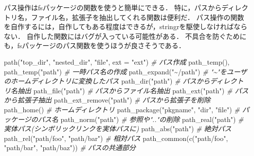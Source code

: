 \documentclass[
]{article}
\newenvironment{Shaded}{\begin{snugshade}}{\end{snugshade}}
\newcommand{\AttributeTok}[1]{\textcolor[rgb]{0.77,0.63,0.00}{#1}}
\newcommand{\CommentTok}[1]{\textcolor[rgb]{0.56,0.35,0.01}{\textit{#1}}}
\newcommand{\FunctionTok}[1]{\textcolor[rgb]{0.00,0.00,0.00}{#1}}
\newcommand{\NormalTok}[1]{#1}
\newcommand{\StringTok}[1]{\textcolor[rgb]{0.31,0.60,0.02}{#1}}
\begin{document}
パス操作はfsパッケージの関数を使うと簡単にできる．
特に，パスからディレクトリ名，ファイル名，拡張子を抽出してくれる関数は便利だ．
パス操作の関数を自作するには，自作してもある程度はできるが，stringrを駆使しなければならない．
自作した関数にはバグが入っている可能性がある．
不具合を防ぐためにも，fsパッケージのパス関数を使うほうが良さそうである．

\begin{Shaded}
\begin{Highlighting}[]
\FunctionTok{path}\NormalTok{(}\StringTok{"top\_dir"}\NormalTok{, }\StringTok{"nested\_dir"}\NormalTok{, }\StringTok{"file"}\NormalTok{, }\AttributeTok{ext =} \StringTok{"ext"}\NormalTok{)  }\CommentTok{\# パス作成   }
\FunctionTok{path\_temp}\NormalTok{(), }\FunctionTok{path\_temp}\NormalTok{(}\StringTok{"path"}\NormalTok{)                      }\CommentTok{\# 一時パス名の作成   }
\FunctionTok{path\_expand}\NormalTok{(}\StringTok{"\textasciitilde{}/path"}\NormalTok{)                               }\CommentTok{\# "\textasciitilde{}"をユーザのホームディレクトリに変換したパス   }
\FunctionTok{path\_dir}\NormalTok{(}\StringTok{"path"}\NormalTok{)                                    }\CommentTok{\# パスからディレクトリ名抽出   }
\FunctionTok{path\_file}\NormalTok{(}\StringTok{"path"}\NormalTok{)                                   }\CommentTok{\# パスからファイル名抽出   }
\FunctionTok{path\_ext}\NormalTok{(}\StringTok{"path"}\NormalTok{)                                    }\CommentTok{\# パスから拡張子抽出   }
\FunctionTok{path\_ext\_remove}\NormalTok{(}\StringTok{"path"}\NormalTok{)                             }\CommentTok{\# パスから拡張子を削除   }
\FunctionTok{path\_home}\NormalTok{()                                         }\CommentTok{\# ホームディレクトリ   }
\FunctionTok{path\_package}\NormalTok{(}\StringTok{"pkgname"}\NormalTok{, }\StringTok{"dir"}\NormalTok{, }\StringTok{"file"}\NormalTok{)              }\CommentTok{\# パッケージのパス名   }
\FunctionTok{path\_norm}\NormalTok{(}\StringTok{"path"}\NormalTok{)                                   }\CommentTok{\# 参照や".."の削除   }
\FunctionTok{path\_real}\NormalTok{(}\StringTok{"path"}\NormalTok{)                                   }\CommentTok{\# 実体パス(シンボリックリンクを実体パスに)   }
\FunctionTok{path\_abs}\NormalTok{(}\StringTok{"path"}\NormalTok{)                                    }\CommentTok{\# 絶対パス}
\FunctionTok{path\_rel}\NormalTok{(}\StringTok{"path/foo"}\NormalTok{, }\StringTok{"path/bar"}\NormalTok{)                    }\CommentTok{\# 相対パス}
\FunctionTok{path\_common}\NormalTok{(}\FunctionTok{c}\NormalTok{(}\StringTok{"path/foo"}\NormalTok{, }\StringTok{"path/bar"}\NormalTok{, }\StringTok{"path/baz"}\NormalTok{))  }\CommentTok{\# パスの共通部分   }

\end{Highlighting}
\end{Shaded}
\end{document}
